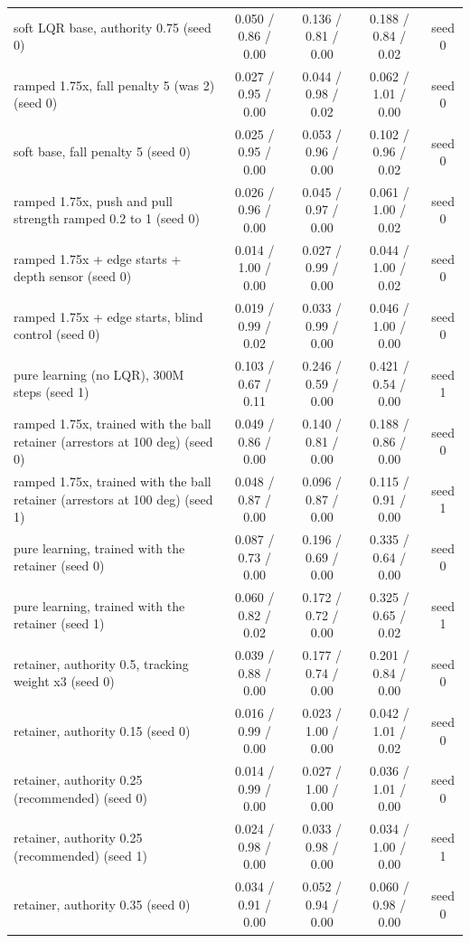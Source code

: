 \begin{table}[t]
{\begin{tabular}{lcccc}
soft LQR base, authority 0.75 (seed 0) & 0.050 / 0.86 / 0.00 & 0.136 / 0.81 / 0.00 & 0.188 / 0.84 / 0.02 & seed 0\\
ramped 1.75x, fall penalty 5 (was 2) (seed 0) & 0.027 / 0.95 / 0.00 & 0.044 / 0.98 / 0.02 & 0.062 / 1.01 / 0.00 & seed 0\\
soft base, fall penalty 5 (seed 0) & 0.025 / 0.95 / 0.00 & 0.053 / 0.96 / 0.00 & 0.102 / 0.96 / 0.02 & seed 0\\
ramped 1.75x, push and pull strength ramped 0.2 to 1 (seed 0) & 0.026 / 0.96 / 0.00 & 0.045 / 0.97 / 0.00 & 0.061 / 1.00 / 0.02 & seed 0\\
ramped 1.75x + edge starts + depth sensor (seed 0) & 0.014 / 1.00 / 0.00 & 0.027 / 0.99 / 0.00 & 0.044 / 1.00 / 0.02 & seed 0\\
ramped 1.75x + edge starts, blind control (seed 0) & 0.019 / 0.99 / 0.02 & 0.033 / 0.99 / 0.00 & 0.046 / 1.00 / 0.00 & seed 0\\
pure learning (no LQR), 300M steps (seed 1) & 0.103 / 0.67 / 0.11 & 0.246 / 0.59 / 0.00 & 0.421 / 0.54 / 0.00 & seed 1\\
ramped 1.75x, trained with the ball retainer (arrestors at 100 deg) (seed 0) & 0.049 / 0.86 / 0.00 & 0.140 / 0.81 / 0.00 & 0.188 / 0.86 / 0.00 & seed 0\\
ramped 1.75x, trained with the ball retainer (arrestors at 100 deg) (seed 1) & 0.048 / 0.87 / 0.00 & 0.096 / 0.87 / 0.00 & 0.115 / 0.91 / 0.00 & seed 1\\
pure learning, trained with the retainer (seed 0) & 0.087 / 0.73 / 0.00 & 0.196 / 0.69 / 0.00 & 0.335 / 0.64 / 0.00 & seed 0\\
pure learning, trained with the retainer (seed 1) & 0.060 / 0.82 / 0.02 & 0.172 / 0.72 / 0.00 & 0.325 / 0.65 / 0.02 & seed 1\\
retainer, authority 0.5, tracking weight x3 (seed 0) & 0.039 / 0.88 / 0.00 & 0.177 / 0.74 / 0.00 & 0.201 / 0.84 / 0.00 & seed 0\\
retainer, authority 0.15 (seed 0) & 0.016 / 0.99 / 0.00 & 0.023 / 1.00 / 0.00 & 0.042 / 1.01 / 0.02 & seed 0\\
retainer, authority 0.25 (recommended) (seed 0) & 0.014 / 0.99 / 0.00 & 0.027 / 1.00 / 0.00 & 0.036 / 1.01 / 0.00 & seed 0\\
retainer, authority 0.25 (recommended) (seed 1) & 0.024 / 0.98 / 0.00 & 0.033 / 0.98 / 0.00 & 0.034 / 1.00 / 0.00 & seed 1\\
retainer, authority 0.35 (seed 0) & 0.034 / 0.91 / 0.00 & 0.052 / 0.94 / 0.00 & 0.060 / 0.98 / 0.00 & seed 0\\

\end{tabular}}
\end{table}

